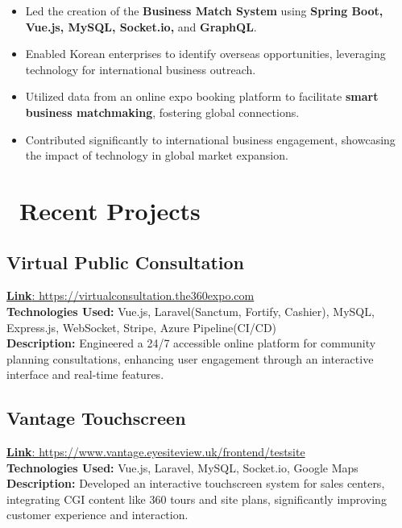 \documentclass{resume}
\begin{document}
\begin{itemize}
  \item Led the creation of the \textbf{Business Match System} using \textbf{Spring Boot, Vue.js, MySQL, Socket.io,} and \textbf{GraphQL}.
  \item Enabled Korean enterprises to identify overseas opportunities, leveraging technology for international business outreach.
  \item Utilized data from an online expo booking platform to facilitate \textbf{smart business matchmaking}, fostering global connections.
  \item Contributed significantly to international business engagement, showcasing the impact of technology in global market expansion.
\end{itemize}


\section{\faServer\ Recent Projects}
\subsection*{\textbf{Virtual Public Consultation}}
\href{https://virtualconsultation.the360expo.com}{\textbf{Link}: https://virtualconsultation.the360expo.com}  \\
\textbf{Technologies Used:} Vue.js, Laravel(Sanctum, Fortify, Cashier), MySQL, Express.js, WebSocket, Stripe, Azure Pipeline(CI/CD) \\
\textbf{Description:} Engineered a 24/7 accessible online platform for community planning consultations, enhancing user engagement through an interactive interface and real-time features.

\subsection*{\textbf{Vantage Touchscreen}}
\href{https://www.vantage.eyesiteview.uk/frontend/testsite}{\textbf{Link}: https://www.vantage.eyesiteview.uk/frontend/testsite}  \\
\textbf{Technologies Used:} Vue.js, Laravel, MySQL, Socket.io, Google Maps \\
\textbf{Description:} Developed an interactive touchscreen system for sales centers, integrating CGI content like 360 tours and site plans, significantly improving customer experience and interaction.
\end{document}
